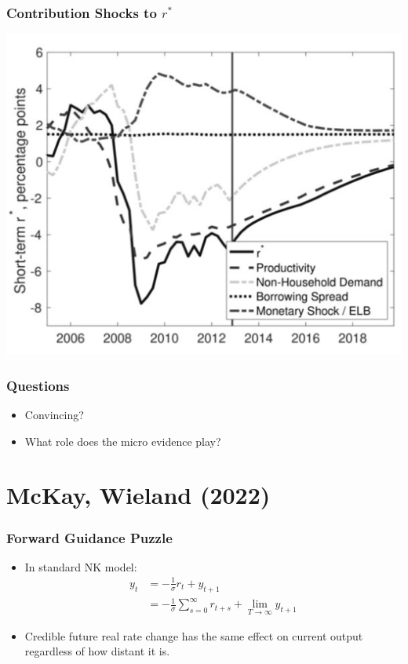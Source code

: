 \documentclass[english,xcolor=svgnames]{beamer}
\begin{document}
\begin{frame}
    \frametitle{Contribution Shocks to $r^*$}
    \begin{center}
    	\includegraphics[scale=0.3]{figures/MWFIG11.png}	
    \end{center}
\end{frame}

\begin{frame}
    \frametitle{Questions}
	\begin{itemize}
		\item Convincing?
		\item What role does the micro evidence play?
	\end{itemize}
\end{frame}

\section{McKay, Wieland (2022)}

\begin{frame}
    \frametitle{Forward Guidance Puzzle}
    \begin{itemize}
    	\item In standard NK model:
    	\begin{align*}
    		y_t  &= -\frac{1}{\sigma}r_t +  y_{t+1} \\
    		&= -\frac{1}{\sigma}\sum_{s=0}^{\infty}r_{t+s} + \lim_{T \rightarrow \infty} y_{t+1} 
    	\end{align*}
    	\item Credible future real rate change has the same effect on current output regardless of how distant it is.
    \end{itemize}
\end{frame}
\end{document}

